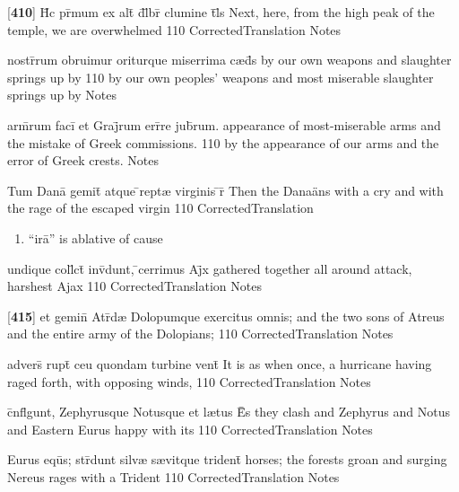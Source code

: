 \latline
  {[\textbf{410}] H\={\macron {\i}}c pr\={\macron {\i}}mum ex alt\={} d\={}l\={}br\={\macron {\i}} clumine t\={}l\={\macron {\i}}s}
  { Next, here, from the high peak of the temple, we are overwhelmed  }
  {110}
  { CorrectedTranslation }
  { Notes }


\latline
  {nostr\={}rum obruimur oriturque miserrima c{\ae}d\={}s}
  { by our own weapons and slaughter springs up by  }
  {110}
  { by our own peoples' weapons and most miserable slaughter springs up by }
  { Notes }


\latline
  {arm\={}rum faci\={} et Graj\={}rum err\={}re jub\={}rum.}
  { appearance of most-miserable arms and the mistake of Greek commissions. }
  {110}
  { by the appearance of our arms and the error of Greek crests. }
  { Notes }


\latline
  {Tum Dana\={\macron {\i}} gemit\={} atque \={}rept{\ae} virginis \={\macron {\i}}r\={}}
  { Then the Dana\"ans with a cry and with the rage of the escaped virgin }
  {110}
  { CorrectedTranslation }
  { \begin{enumerate}
  	\item ``ir\={a}'' is ablative of cause
  \end{enumerate} }


\latline
  {undique coll\={}ct\={\macron {\i}} inv\={}dunt, \={}cerrimus Aj\={}x}
  { gathered together all around attack, harshest Ajax }
  {110}
  { CorrectedTranslation }
  { Notes }


\latline
  {[\textbf{415}] et gemin\={\macron {\i}} Atr\={\macron {\i}}d{\ae} Dolopumque exercitus omnis;}
  { and the two sons of Atreus and the entire army of the Dolopians; }
  {110}
  { CorrectedTranslation }
  { Notes }


\latline
  {advers\={\macron {\i}} rupt\={} ceu quondam turbine vent\={\macron {\i}}}
  { It is as when once, a hurricane having raged forth, with opposing winds, }
  {110}
  { CorrectedTranslation }
  { Notes }


\latline
  {c\={}nfl\={\macron {\i}}gunt, Zephyrusque Notusque et l{\ae}tus E\={}\={\macron {\i}}s}
  { they clash and Zephyrus and Notus and Eastern Eurus happy with its  }
  {110}
  { CorrectedTranslation }
  { Notes }


\latline
  {Eurus equ\={\macron {\i}}s; str\={\macron {\i}}dunt silv{\ae} s{\ae}vitque trident\={\macron {\i}}}
  { horses; the forests groan and surging Nereus rages with a Trident }
  {110}
  { CorrectedTranslation }
  { Notes }


